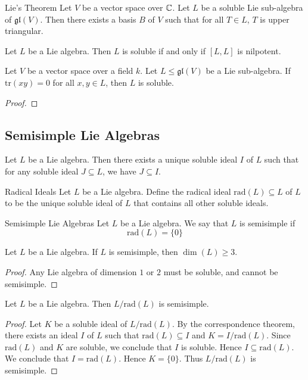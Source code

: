 \documentclass[a4paper]{article}
\begin{document}
\begin{thm}{Lie's Theorem}{} Let $V$ be a vector space over $\mathbb{C}$. Let $L$ be a soluble Lie sub-algebra of $\mathfrak{gl}(V)$. Then there exists a basis $B$ of $V$ such that for all $T\in L$, $T$ is upper triangular. 
\end{thm}

\begin{prp}{}{} Let $L$ be a Lie algebra. Then $L$ is soluble if and only if $[L,L]$ is nilpotent. 
\end{prp}

\begin{prp}{}{} Let $V$ be a vector space over a field $k$. Let $L\leq\mathfrak{gl}(V)$ be a Lie sub-algebra. If $\text{tr}(xy)=0$ for all $x,y\in L$, then $L$ is soluble. \tcbline
\begin{proof}

\end{proof}
\end{prp}

\subsection{Semisimple Lie Algebras}
\begin{prp}{}{} Let $L$ be a Lie algebra. Then there exists a unique soluble ideal $I$ of $L$ such that for any soluble ideal $J\subseteq L$, we have $J\subseteq I$. 
\end{prp}

\begin{defn}{Radical Ideals}{} Let $L$ be a Lie algebra. Define the radical ideal $\text{rad}(L)\subseteq L$ of $L$ to be the unique soluble ideal of $L$ that contains all other soluble ideals. 
\end{defn}

\begin{defn}{Semisimple Lie Algebras}{}{} Let $L$ be a Lie algebra. We say that $L$ is semisimple if $$\text{rad}(L)=\{0\}$$
\end{defn}

\begin{lmm}{}{} Let $L$ be a Lie algebra. If $L$ is semisimple, then $\dim(L)\geq 3$. \tcbline
\begin{proof}
Any Lie algebra of dimension $1$ or $2$ must be soluble, and cannot be semisimple. 
\end{proof}
\end{lmm}

\begin{lmm}{}{} Let $L$ be a Lie algebra. Then $L/\text{rad}(L)$ is semisimple. \tcbline
\begin{proof}
Let $K$ be a soluble ideal of $L/\text{rad}(L)$. By the correspondence theorem, there exists an ideal $I$ of $L$ such that $\text{rad}(L)\subseteq I$ and $K=I/\text{rad}(L)$. Since $\text{rad}(L)$ and $K$ are soluble, we conclude that $I$ is soluble. Hence $I\subseteq\text{rad}(L)$. We conclude that $I=\text{rad}(L)$. Hence $K=\{0\}$. Thus $L/\text{rad}(L)$ is semisimple. 
\end{proof}
\end{lmm}
\end{document}
